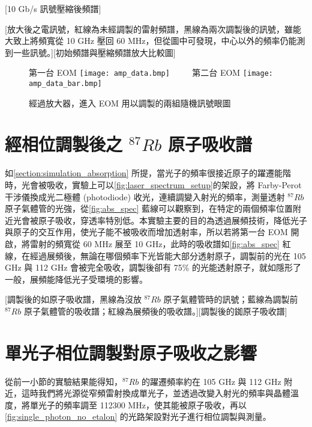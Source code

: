 \documentclass[class=NCU_thesis, crop=false]{standalone}
\begin{document}
[10 Gb/s 訊號壓縮後頻譜]

[放大後之電訊號，紅線為未經調製的雷射頻譜，黑線為兩次調製後的訊號，雖能大致上將頻寬從 10 GHz 壓回 60 MHz，但從圖中可發現，中心以外的頻率仍能測到一些訊號。][初始頻譜與壓縮頻譜放大比較圖]

\begin{figure}[!hbt]
    \centering
    \subcaptionbox
        {第一台 EOM 
        \label{fig:subfig_fig1}}
        {\texttt{[image: amp\_data.bmp]}}
    ~~~~
    \subcaptionbox
        {第二台 EOM
        \label{fig:subfig_fig2}}
        {\texttt{[image: amp\_data\_bar.bmp]}}
    \caption{經過放大器，進入 EOM 用以調製的兩組隨機訊號眼圖}
    \label{fig:amplified_signal}
\end{figure}

\section{經相位調製後之 $^{87}Rb$ 原子吸收譜}

如\cref{section:simulation_absorption} 所提，當光子的頻率很接近原子的躍遷能階時，光會被吸收，實驗上可以\cref{fig:laser_spectrum_setup}的架設，將 Farby-Perot 干涉儀換成光二極體 (photodiode) 收光，連續調變入射光的頻率，測量透射 $^{87}Rb$ 原子氣體管的光強，從\cref{fig:abs_spec} 藍線可以觀察到，在特定的兩個頻率位置附近光會被原子吸收，穿透率特別低。本實驗主要的目的為透過展頻技術，降低光子與原子的交互作用，使光子能不被吸收而增加透射率，所以若將第一台 EOM 開啟，將雷射的頻寬從 60 MHz 展至 10 GHz，此時的吸收譜如\cref{fig:abs_spec} 紅線，在經過展頻後，無論在哪個頻率下光皆能大部分透射原子，調製前的光在 105 GHz 與 112 GHz 會被完全吸收，調製後卻有 75\% 的光能透射原子，就如隱形了一般，展頻能降低光子受環境的影響。

[調製後的如原子吸收譜，黑線為沒放 $^{87}Rb$ 原子氣體管時的訊號；藍線為調製前 $^{87}Rb$ 原子氣體管的吸收譜；紅線為展頻後的吸收譜。][調製後的銣原子吸收譜]

\section{單光子相位調製對原子吸收之影響}
從前一小節的實驗結果能得知，$^{87}Rb$ 的躍遷頻率約在 105 GHz 與 112 GHz 附近，這時我們將光源從窄頻雷射換成單光子，並透過改變入射光的頻率與晶體溫度，將單光子的頻率調至 112300 MHz，使其能被原子吸收，再以\cref{fig:single_photon_no_etalon} 的光路架設對光子進行相位調製與測量。
\end{document}
